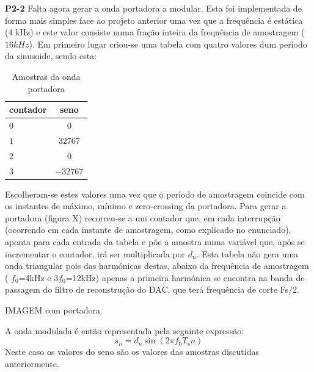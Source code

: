 \documentclass[11pt]{article}
\begin{document}
\vspace{2 mm}
\textbf{P2-2}
Falta agora gerar a onda portadora a modular. Esta foi implementada de forma mais simples face ao projeto anterior uma vez que a frequência é estática (4 kHz) e este valor consiste numa fração inteira da frequência de amostragem ($16 kHz$).
Em primeiro lugar criou-se uma tabela com quatro valores dum período da sinusoide, sendo esta: %
\begin{table}[H]
	\centering
	\caption{Amostras da onda portadora}
	\label{tab:amostras}
	\begin{tabular}[c]{|l||c|}
		\hline \textbf{contador} & \textbf{seno}\\ 
		\hline $ 0 $ & $ 0 $\\ 
		\hline $ 1 $ & $ 32767 $  \\ 
		\hline $ 2 $ & $ 0 $ \\ 
		\hline $ 3 $ & $ -32767 $ \\
		\hline
	\end{tabular}
\end{table}

Escolheram-se estes valores uma vez que o período de amostragem coincide com os instantes de máximo, mínimo e zero-crossing da portadora. Para gerar a portadora (figura X) recorreu-se a um contador que, em cada interrupção (ocorrendo em cada instante de amostragem, como explicado no enunciado), aponta para cada entrada da tabela e põe a amostra numa variável que, após se incrementar o contador, irá ser multiplicada por $d_n$. Esta tabela não gera uma onda triangular pois das harmónicas destas, abaixo da frequência de amostragem ( $f_0$=4kHz e 3$f_0$=12kHz) apenas a primeira harmónica se encontra na banda de passagem do filtro de reconstrução do DAC, que terá frequência de corte Fs/2.

IMAGEM com portadora

A onda modulada é então representada pela seguinte expressão:
\begin{equation}
	s_n= d_n \sin(2 \pi f_0T_sn) 
\end{equation}
Neste caso os valores do seno são os valores das amostras discutidas anteriormente.


\vspace{2 mm}
\end{document}
